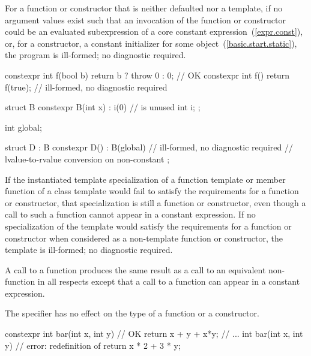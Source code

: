 \pnum
For a  function or  constructor
that is neither defaulted nor a template,
if no argument values exist such that
an invocation of the function or constructor could be an evaluated subexpression of a core
constant expression~(\ref{expr.const}), or,
for a constructor, a constant initializer for some object~(\ref{basic.start.static}),
the program is ill-formed; no diagnostic required.
\enterexample
\begin{codeblock}
constexpr int f(bool b)
  { return b ? throw 0 : 0; }               // OK
constexpr int f() { return f(true); }       // ill-formed, no diagnostic required

struct B {
  constexpr B(int x) : i(0) { }             //  is unused
  int i;
};

int global;

struct D : B {
  constexpr D() : B(global) { }             // ill-formed, no diagnostic required
                                            // lvalue-to-rvalue conversion on non-constant 
};
\end{codeblock}

\exitexample

\pnum
If the instantiated template specialization of a  function
template
or member function of a class template
would fail to satisfy the requirements for a 
function or  constructor,
that specialization is still a  function or 
constructor, even though a call to such a function cannot appear in a constant
expression. If no specialization of the template would satisfy the
requirements for a  function or  constructor
when considered as a non-template function or constructor, the template is
ill-formed; no diagnostic
required.

\pnum
A call to a  function produces the same result as a call to an equivalent
non- function in all respects except that a call to a 
function can appear in a constant expression.

\pnum
The  specifier has no
effect on the type of a  function or a  constructor.  \enterexample
\begin{codeblock}
constexpr int bar(int x, int y) // OK 
    { return x + y + x*y; } 
// ... 
int bar(int x, int y)           // error: redefinition of 
    { return x * 2 + 3 * y; } 
\end{codeblock}
\exitexample

